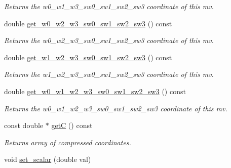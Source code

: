 \begin{DoxyCompactItemize}
\begin{DoxyCompactList}\small\item\em Returns the w0\-\_\-w1\-\_\-w3\-\_\-sw0\-\_\-sw1\-\_\-sw2\-\_\-sw3 coordinate of this mv. \end{DoxyCompactList}\item 
\hypertarget{classe3ga_1_1mv_a1447398123862f54d6fd6168fa7c1cfe}{double \hyperlink{classe3ga_1_1mv_a1447398123862f54d6fd6168fa7c1cfe}{get\-\_\-w0\-\_\-w2\-\_\-w3\-\_\-sw0\-\_\-sw1\-\_\-sw2\-\_\-sw3} () const }\label{classe3ga_1_1mv_a1447398123862f54d6fd6168fa7c1cfe}

\begin{DoxyCompactList}\small\item\em Returns the w0\-\_\-w2\-\_\-w3\-\_\-sw0\-\_\-sw1\-\_\-sw2\-\_\-sw3 coordinate of this mv. \end{DoxyCompactList}\item 
\hypertarget{classe3ga_1_1mv_a67d47a982006c2e4e26e05d30bb9e329}{double \hyperlink{classe3ga_1_1mv_a67d47a982006c2e4e26e05d30bb9e329}{get\-\_\-w1\-\_\-w2\-\_\-w3\-\_\-sw0\-\_\-sw1\-\_\-sw2\-\_\-sw3} () const }\label{classe3ga_1_1mv_a67d47a982006c2e4e26e05d30bb9e329}

\begin{DoxyCompactList}\small\item\em Returns the w1\-\_\-w2\-\_\-w3\-\_\-sw0\-\_\-sw1\-\_\-sw2\-\_\-sw3 coordinate of this mv. \end{DoxyCompactList}\item 
\hypertarget{classe3ga_1_1mv_afc59b03567f967440436702619c065f3}{double \hyperlink{classe3ga_1_1mv_afc59b03567f967440436702619c065f3}{get\-\_\-w0\-\_\-w1\-\_\-w2\-\_\-w3\-\_\-sw0\-\_\-sw1\-\_\-sw2\-\_\-sw3} () const }\label{classe3ga_1_1mv_afc59b03567f967440436702619c065f3}

\begin{DoxyCompactList}\small\item\em Returns the w0\-\_\-w1\-\_\-w2\-\_\-w3\-\_\-sw0\-\_\-sw1\-\_\-sw2\-\_\-sw3 coordinate of this mv. \end{DoxyCompactList}\item 
\hypertarget{classe3ga_1_1mv_a40f637068815104fadb25e6d5995d6cb}{const double $\ast$ \hyperlink{classe3ga_1_1mv_a40f637068815104fadb25e6d5995d6cb}{get\-C} () const }\label{classe3ga_1_1mv_a40f637068815104fadb25e6d5995d6cb}

\begin{DoxyCompactList}\small\item\em Returns array of compressed coordinates. \end{DoxyCompactList}\item 
\hypertarget{classe3ga_1_1mv_a39c19ea99afa8759cc971e2d8c7ab3dd}{void \hyperlink{classe3ga_1_1mv_a39c19ea99afa8759cc971e2d8c7ab3dd}{set\-\_\-scalar} (double val)}\label{classe3ga_1_1mv_a39c19ea99afa8759cc971e2d8c7ab3dd}


\end{DoxyCompactItemize}
